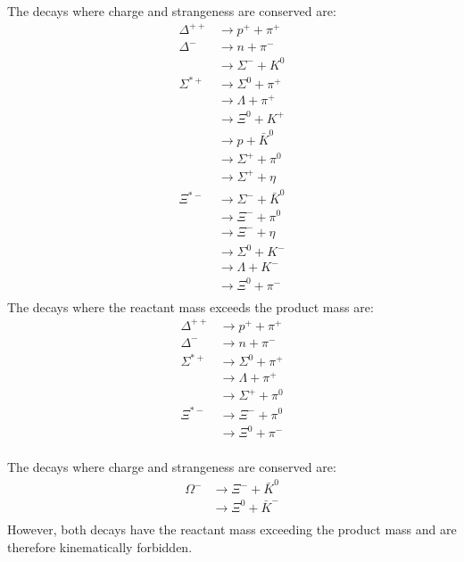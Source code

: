 \documentclass{article}
\begin{document}
The decays where charge and strangeness are conserved are:
\begin{equation}
    \begin{split}
        \Delta^{++} & \to p^{+} + \pi^{+} \\
        \Delta^{-} & \to n + \pi^{-} \\
        & \to \Sigma^{-} + K^{0} \\
        \Sigma^{*+} & \to \Sigma^{0} + \pi^{+} \\
        & \to \Lambda + \pi^{+} \\
        & \to \Xi^{0} + K^{+} \\
        & \to p + \bar{K}^{0} \\
        & \to \Sigma^{+} + \pi^{0} \\
        & \to \Sigma^{+} + \eta \\
        \Xi^{*-} & \to \Sigma^{-} + \bar{K}^0 \\
        & \to \Xi^{-} + \pi^{0} \\
        & \to \Xi^{-} + \eta \\
        & \to \Sigma^{0} + K^{-} \\
        & \to \Lambda + K^{-} \\
        & \to \Xi^{0} + \pi^{-} \\
    \end{split}
\end{equation}
The decays where the reactant mass exceeds the product mass are:
\begin{equation}
    \begin{split}
        \Delta^{++} & \to p^{+} + \pi^{+} \\
        \Delta^{-} & \to n + \pi^{-} \\
        \Sigma^{*+} & \to \Sigma^{0} + \pi^{+} \\
        & \to \Lambda + \pi^{+} \\
        & \to \Sigma^{+} + \pi^{0} \\
        \Xi^{*-} & \to \Xi^{-} + \pi^{0} \\
        & \to \Xi^{0} + \pi^{-} \\
    \end{split}
\end{equation}

\clearpage

The decays where charge and strangeness are conserved are:
\begin{equation}
    \begin{split}
        \Omega^{-} & \to \Xi^{-} + \bar{K}^{0} \\
        & \to \Xi^{0} + \bar{K}^{-} \\
    \end{split}
\end{equation}
However, both decays have the reactant mass exceeding the product mass and are therefore kinematically forbidden.
\end{document}

